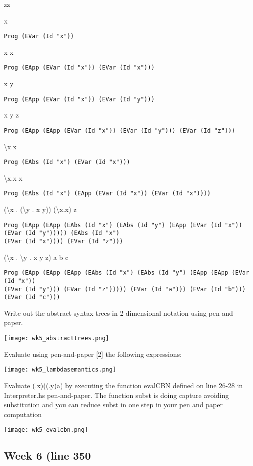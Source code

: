 zz\documentclass{article}
\theoremstyle{theorem}
\theoremstyle{definition}
\theoremstyle{remark}
\begin{document}
\parindent x
\begin{verbatim}
Prog (EVar (Id "x"))
\end{verbatim}
x x
\begin{verbatim}
Prog (EApp (EVar (Id "x")) (EVar (Id "x")))
\end{verbatim}
x y
\begin{verbatim}
Prog (EApp (EVar (Id "x")) (EVar (Id "y")))
\end{verbatim}
x y z
\begin{verbatim}
Prog (EApp (EApp (EVar (Id "x")) (EVar (Id "y"))) (EVar (Id "z")))
\end{verbatim}
\textbackslash x.x
\begin{verbatim}
Prog (EAbs (Id "x") (EVar (Id "x")))
\end{verbatim}
\textbackslash x.x x
\begin{verbatim}
Prog (EAbs (Id "x") (EApp (EVar (Id "x")) (EVar (Id "x"))))
\end{verbatim}
(\textbackslash x . (\textbackslash y . x y)) (\textbackslash x.x) z
\begin{verbatim}
Prog (EApp (EApp (EAbs (Id "x") (EAbs (Id "y") (EApp (EVar (Id "x")) (EVar (Id "y"))))) (EAbs (Id "x") 
(EVar (Id "x")))) (EVar (Id "z")))
\end{verbatim}
(\textbackslash x . \textbackslash y . x y z) a b c
\begin{verbatim}
Prog (EApp (EApp (EApp (EAbs (Id "x") (EAbs (Id "y") (EApp (EApp (EVar (Id "x")) 
(EVar (Id "y"))) (EVar (Id "z"))))) (EVar (Id "a"))) (EVar (Id "b"))) (EVar (Id "c")))
\end{verbatim}

Write out the abstract syntax trees in 2-dimensional notation using pen and paper.

\texttt{[image: wk5\_abstracttrees.png]}

Evaluate using pen-and-paper [2] the following expressions:

\texttt{[image: wk5\_lambdasemantics.png]}

Evaluate (\x.x)((\y.y)a) by executing the function evalCBN defined on line 26-28 in Interpreter.hs pen-and-paper. The function subst is doing capture avoiding substitution and you can reduce subst in one step in your pen and paper computation

\texttt{[image: wk5\_evalcbn.png]}

\subsection{Week 6 (line 350}
\end{document}
